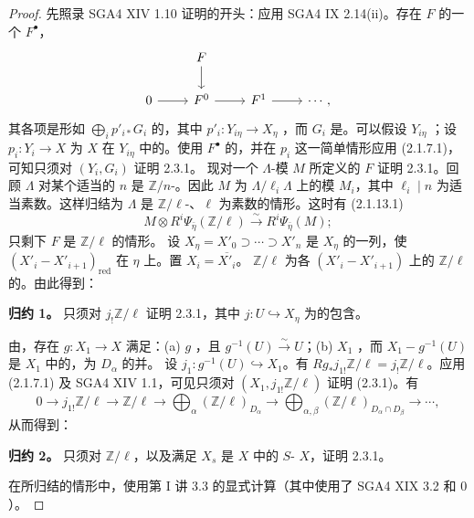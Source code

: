 \begin{proof}
先照录 SGA4 XIV 1.10 证明的开头：应用 SGA4 IX 2.14(ii)。存在 $F$ 的一个 $F^\bullet$，
\[
\begin{tikzcd}
&F\arrow[d]&&\\
0\arrow[r]&F^0\arrow[r]&F^1\arrow[r]&\cdots,
\end{tikzcd}
\]
其各项是形如 $\bigoplus_i p'_{i*}G_i$ 的，其中 $p'_i:Y_{i\eta}\to X_\eta$ ，而 $G_i$ 是。可以假设 $Y_{i\eta}$ ；设 $p_i:Y_i\to X$ 为 $X$ 在 $Y_{i\eta}$ 中的。使用 $F^\bullet$ 的，并在 $p_i$ 这一简单情形应用 (2.1.7.1)，可知只须对 $(Y_i,G_i)$ 证明 2.3.1。
现对一个 $\Lambda$-模 $M$ 所定义的 $F$ 证明 2.3.1。回顾 $\Lambda$ 对某个适当的 $n$ 是 $\mathbb Z/n$-。因此 $M$ 为 $\Lambda/\ell_i\Lambda$ 上的模 $M_i$，其中 $\ell_i\mid n$ 为适当素数。这样归结为 $\Lambda$ 是 $\mathbb Z/\ell$-、$\ell$ 为素数的情形。这时有 (2.1.13.1)
\[M\otimes R^i\Psi_{\bar\eta}(\mathbb Z/\ell)\xrightarrow\sim R^i\Psi_{\bar\eta}(M);\]
只剩下 $F$ 是 $\mathbb Z/\ell$ 的情形。
设 $X_\eta=X'_0\supset\cdots\supset X'_n$ 是 $X_\eta$ 的一列，使 $(X'_i-X'_{i+1})_{\mathrm{red}}$ 在 $\eta$ 上。置 $X_i=\overline{X'_i}$。 $\mathbb Z/\ell$ 为各 $(X'_i-X'_{i+1})$ 上的 $\mathbb Z/\ell$ 的。由此得到：

\textbf{归约 1。} 只须对 $j_!\mathbb Z/\ell$ 证明 2.3.1，其中 $j:U\hookrightarrow X_\eta$ 为的包含。

由，存在 $g:X_1\to X$ 满足：(a) $g$ ，且 $g^{-1}(U)\xrightarrow\sim U$；(b) $X_1$ ，而 $X_1-g^{-1}(U)$ 是 $X_1$ 中的，为 $D_\alpha$ 的并。
设 $j_1:g^{-1}(U)\hookrightarrow X_1$。有 $Rg_*j_{1!}\mathbb Z/\ell=j_!\mathbb Z/\ell$。应用 (2.1.7.1) 及 SGA4 XIV 1.1，可见只须对 $(X_1,j_{1!}\mathbb Z/\ell)$ 证明 (2.3.1)。有
\[
0\longrightarrow j_{1!}\mathbb Z/\ell\longrightarrow\mathbb Z/\ell\longrightarrow\bigoplus_\alpha(\mathbb Z/\ell)_{D_\alpha}\longrightarrow\bigoplus_{\alpha,\beta}(\mathbb Z/\ell)_{D_\alpha\cap D_\beta}\longrightarrow\cdots,
\]
从而得到：

\textbf{归约 2。} 只须对 $\mathbb Z/\ell$，以及满足 $X_s$ 是 $X$ 中的 $S$- $X$，证明 2.3.1。

在所归结的情形中，使用第 I 讲 3.3 的显式计算（其中使用了 SGA4 XIX 3.2 和 $0$）。
\end{proof}

